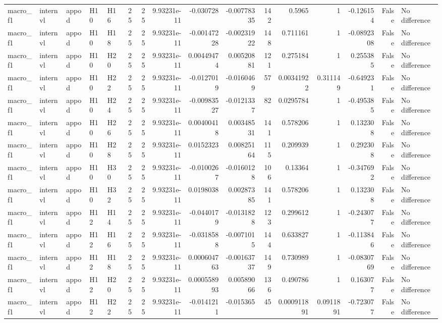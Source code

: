 \begin{longtable}{lllllrrrrrrrrrrl}
macro\_f1 & internvl & appod & H10 & H16 & 25 & 25 & 9.93231e-11 & -0.030728 & -0.00778335 & 142 & 0.5965 & 1 & -0.126154 & False & No difference \\
macro\_f1 & internvl & appod & H10 & H18 & 25 & 25 & 9.93231e-11 & -0.00147228 & -0.00231922 & 148 & 0.711161 & 1 & -0.0892308 & False & No difference \\
macro\_f1 & internvl & appod & H10 & H20 & 25 & 25 & 9.93231e-11 & 0.00449474 & 0.00520881 & 121 & 0.275184 & 1 & 0.255385 & False & No difference \\
macro\_f1 & internvl & appod & H10 & H22 & 25 & 25 & 9.93231e-11 & -0.0127019 & -0.0160469 & 57 & 0.00341922 & 0.311149 & -0.649231 & False & No difference \\
macro\_f1 & internvl & appod & H10 & H24 & 25 & 25 & 9.93231e-11 & -0.00983527 & -0.0121337 & 82 & 0.0295784 & 1 & -0.495385 & False & No difference \\
macro\_f1 & internvl & appod & H10 & H26 & 25 & 25 & 9.93231e-11 & 0.00400418 & 0.00348531 & 141 & 0.578206 & 1 & 0.132308 & False & No difference \\
macro\_f1 & internvl & appod & H10 & H28 & 25 & 25 & 9.93231e-11 & 0.0152323 & 0.00825164 & 115 & 0.209939 & 1 & 0.292308 & False & No difference \\
macro\_f1 & internvl & appod & H10 & H30 & 25 & 25 & 9.93231e-11 & -0.0100267 & -0.0160128 & 106 & 0.13364 & 1 & -0.347692 & False & No difference \\
macro\_f1 & internvl & appod & H10 & H32 & 25 & 25 & 9.93231e-11 & 0.0198038 & 0.00287385 & 141 & 0.578206 & 1 & 0.132308 & False & No difference \\
macro\_f1 & internvl & appod & H12 & H14 & 25 & 25 & 9.93231e-11 & -0.0440179 & -0.0131828 & 123 & 0.299612 & 1 & -0.243077 & False & No difference \\
macro\_f1 & internvl & appod & H12 & H16 & 25 & 25 & 9.93231e-11 & -0.0318588 & -0.0071015 & 144 & 0.633827 & 1 & -0.113846 & False & No difference \\
macro\_f1 & internvl & appod & H12 & H18 & 25 & 25 & 9.93231e-11 & 0.000604763 & -0.00163737 & 149 & 0.730989 & 1 & -0.0830769 & False & No difference \\
macro\_f1 & internvl & appod & H12 & H20 & 25 & 25 & 9.93231e-11 & 0.000558993 & 0.00589066 & 136 & 0.490786 & 1 & 0.163077 & False & No difference \\
macro\_f1 & internvl & appod & H12 & H22 & 25 & 25 & 9.93231e-11 & -0.0141211 & -0.015365 & 45 & 0.000911891 & 0.0911891 & -0.723077 & False & No difference \\

\end{longtable}
